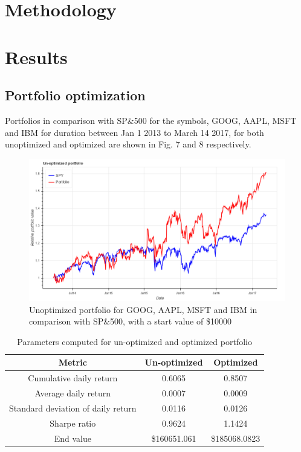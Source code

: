 \documentclass[12pt]{article}
\begin{document}
\section{Methodology}
\label{sec:method}


\section{Results}

\subsection{Portfolio optimization}
\label{sec:opt}

Portfolios in comparison with SP\&500 for the symbols, GOOG, AAPL, MSFT and IBM for duration between Jan 1 2013 to March 14 2017, for both unoptimized and optimized are shown in Fig. 7 and 8 respectively.


\begin{figure}[!htbp]
\label{fig:unoptimized}
\begin{center}
\includegraphics[height=0.5\textheight,width=\textwidth]{unoptimized.png}
\caption{Unoptimized portfolio for GOOG, AAPL, MSFT and IBM in comparison with SP\&500, with a start value of \$10000}
\end{center}
\end{figure}

\begin{table}
\begin{center}
\begin{tabular} {|c|c|c|}
\hline \hline
\textbf{Metric} & \textbf{Un-optimized} & \textbf{Optimized}  \\ \hline
Cumulative daily return & 0.6065 & 0.8507 \\ \hline
Average daily return & 0.0007 & 0.0009\\ \hline
Standard deviation of daily return  & 0.0116 & 0.0126  \\ \hline
Sharpe ratio & 0.9624 & 1.1424 \\ \hline
End value & \$160651.061 & \$185068.0823 \\ \hline
\hline
\end{tabular}
\end{center}
\caption{Parameters computed for un-optimized and optimized portfolio}
\end{table}
\end{document}
